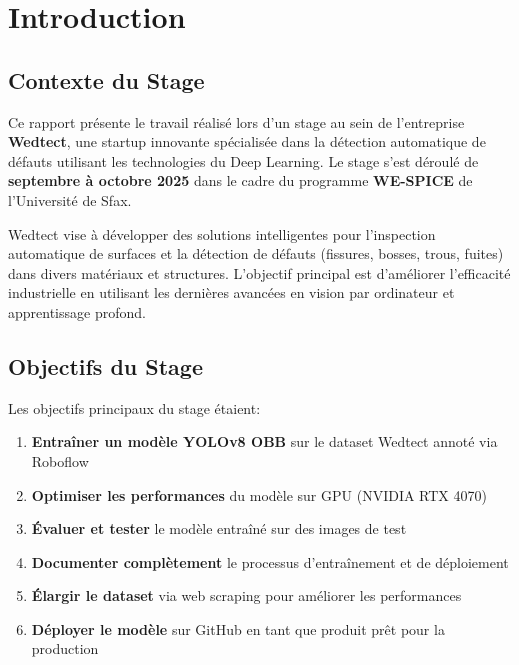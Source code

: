 \documentclass[a4paper,12pt]{report}
\begin{document}
\tableofcontents
\newpage

\chapter{Introduction}

\section{Contexte du Stage}

Ce rapport présente le travail réalisé lors d'un stage au sein de l'entreprise \textbf{Wedtect}, une startup innovante spécialisée dans la détection automatique de défauts utilisant les technologies du Deep Learning. Le stage s'est déroulé de \textbf{septembre à octobre 2025} dans le cadre du programme \textbf{WE-SPICE} de l'Université de Sfax.

Wedtect vise à développer des solutions intelligentes pour l'inspection automatique de surfaces et la détection de défauts (fissures, bosses, trous, fuites) dans divers matériaux et structures. L'objectif principal est d'améliorer l'efficacité industrielle en utilisant les dernières avancées en vision par ordinateur et apprentissage profond.

\section{Objectifs du Stage}

Les objectifs principaux du stage étaient:

\begin{enumerate}
    \item \textbf{Entraîner un modèle YOLOv8 OBB} sur le dataset Wedtect annoté via Roboflow
    \item \textbf{Optimiser les performances} du modèle sur GPU (NVIDIA RTX 4070)
    \item \textbf{Évaluer et tester} le modèle entraîné sur des images de test
    \item \textbf{Documenter complètement} le processus d'entraînement et de déploiement
    \item \textbf{Élargir le dataset} via web scraping pour améliorer les performances
    \item \textbf{Déployer le modèle} sur GitHub en tant que produit prêt pour la production
\end{enumerate}
\end{document}
